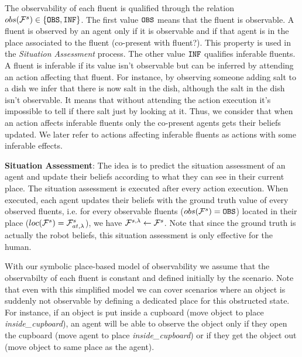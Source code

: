 \documentclass[letterpaper]{article} %
\begin{document}
The observability of each fluent is qualified through the relation $obs( \mathcal{F}^{s}_{} ) \in \{ \texttt{OBS}, \texttt{INF} \}$. 
The first value $\texttt{OBS}$ means that the fluent is observable. A fluent is observed by an agent only if it is observable and if that agent is in the place associated to the fluent (co-present with fluent?). This property is used in the \textit{Situation Assessment} process.
The other value $\texttt{INF}$ qualifies inferable fluents. A fluent is inferable if its value isn't observable but can be inferred by attending an action affecting that fluent. For instance, by observing someone adding salt to a dish we infer that there is now salt in the dish, although the salt in the dish isn't observable. It means that without attending the action execution it's impossible to tell if there salt just by looking at it. Thus, we consider that when an action affects inferable fluents only the co-present agents gets their beliefs updated. We later refer to actions affecting inferable fluents as actions with some inferable effects.

\textbf{Situation Assessment}:
The idea is to predict the situation assessment of an agent and update their beliefs according to what they can see in their current place. The situation assessment is executed after every action execution. When executed, each agent updates their beliefs with the ground truth value of every observed fluents, i.e. for every observable fluents ($obs( \mathcal{F}^{s}_{} ) = \texttt{OBS}$) located in their place ($loc(\mathcal{F}^{s}_{}) = \mathcal{F}^{s}_{at,\lambda}$), we have $\mathcal{F}^{s,\lambda}_{} \gets \mathcal{F}^{s}_{}$. Note that since the ground truth is actually the robot beliefs, this situation assessment is only effective for the human. 

With our symbolic place-based model of observability we assume that the observabilty of each fluent is constant and defined initially by the scenario. Note that even with this simplified model we can cover scenarios where an object is suddenly not observable by defining a dedicated place for this obstructed state. For instance, if an object is put inside a cupboard (move object to place \textit{inside\_cupboard}), an agent will be able to observe the object only if they open the cupboard (move agent to place \textit{inside\_cupboard}) or if they get the object out (move object to same place as the agent).
\end{document}
